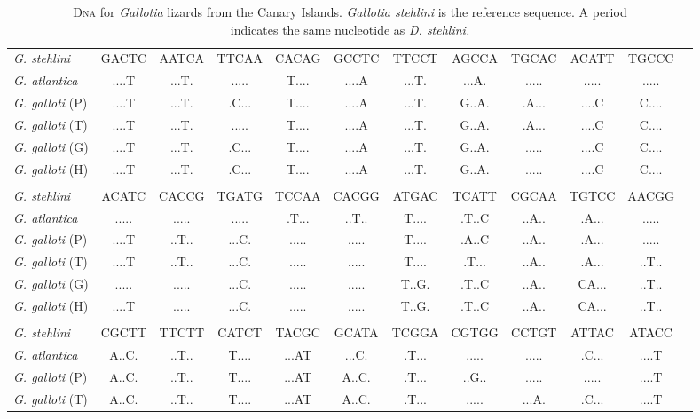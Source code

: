 \documentclass[12pt, hidelinks]{exam}
\begin{document}
\newpage

\begin{landscape}

{\fontsize{11pt}{13pt}\selectfont
\dnatable
\begin{longtable}[l]{lccccccccccc}
\caption{D\textsc{na} for \textit{Gallotia} lizards from the Canary Islands. \textit{Gallotia stehlini} is the reference sequence. A period \\indicates the same nucleotide as \textit{D. stehlini.}\label{tab:dna_results}}\tabularnewline
\toprule
{\regfont\textit{G. stehlini}}	& GACTC & AATCA & TTCAA & CACAG & GCCTC & TTCCT & AGCCA & TGCAC & ACATT & TGCCC \tabularnewline
{\regfont\textit{G. atlantica}}	& ....T & ...T. & ..... & T.... & ....A & ...T. & ...A. & ..... & ..... & ..... \tabularnewline
{\regfont\textit{G. galloti} (P)}	& ....T & ...T. & .C... & T.... & ....A & ...T. & G..A. & .A... & ....C & C.... \tabularnewline
{\regfont\textit{G. galloti} (T)}	& ....T & ...T. & ..... & T.... & ....A & ...T. & G..A. & .A... & ....C & C.... \tabularnewline
{\regfont\textit{G. galloti} (G)}	& ....T & ...T. & .C... & T.... & ....A & ...T. & G..A. & ..... & ....C & C.... \tabularnewline
{\regfont\textit{G. galloti} (H)}	& ....T & ...T. & .C... & T.... & ....A & ...T. & G..A. & ..... & ....C & C.... \tabularnewline%
&&&&&&&&&&\tabularnewline
{\regfont\textit{G. stehlini}}	& ACATC & CACCG & TGATG & TCCAA & CACGG & ATGAC & TCATT & CGCAA & TGTCC & AACGG \tabularnewline
{\regfont\textit{G. atlantica}}	& ..... & ..... & ..... & .T... & ..T.. & T.... & .T..C & ..A.. & .A... & ..... \tabularnewline
{\regfont\textit{G. galloti} (P)}	& ....T & ..T.. & ...C. & ..... & ..... & T.... & .A..C & ..A.. & .A... & ..... \tabularnewline
{\regfont\textit{G. galloti} (T)}	& ....T & ..T.. & ...C. & ..... & ..... & T.... & .T... & ..A.. & .A... & ..T.. \tabularnewline
{\regfont\textit{G. galloti} (G)}	& ..... & ..... & ...C. & ..... & ..... & T..G. & .T..C & ..A.. & CA... & ..T.. \tabularnewline
{\regfont\textit{G. galloti} (H)}	& ....T & ..... & ...C. & ..... & ..... & T..G. & .T..C & ..A.. & CA... & ..T.. \tabularnewline
&&&&&&&&&&\tabularnewline
{\regfont\textit{G. stehlini}}	& CGCTT & TTCTT & CATCT & TACGC & GCATA & TCGGA & CGTGG & CCTGT & ATTAC & ATACC \tabularnewline
{\regfont\textit{G. atlantica}}	& A..C. & ..T.. & T.... & ...AT & ...C. & .T... & ..... & ..... & .C... & ....T \tabularnewline
{\regfont\textit{G. galloti} (P)}	& A..C. & ..T.. & T.... & ...AT & A..C. & .T... & ..G.. & ..... & ..... & ....T \tabularnewline
{\regfont\textit{G. galloti} (T)}	& A..C. & ..T.. & T.... & ...AT & A..C. & .T... & ..... & ...A. & .C... & ....T \tabularnewline

\end{longtable}}
\end{landscape}
\end{document}
